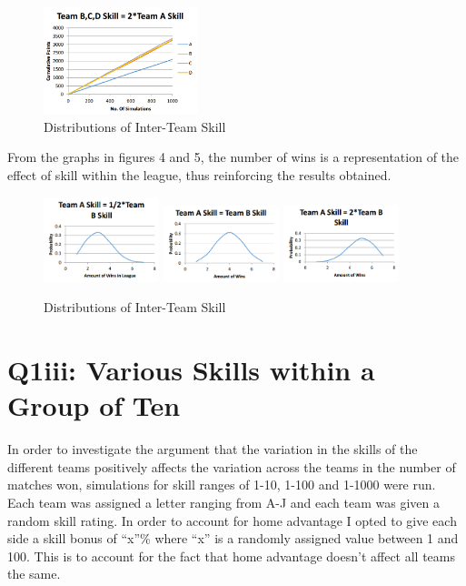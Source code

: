 \documentclass[12pt]{article}
\begin{document}
\begin{figure}[H]
\centering
\includegraphics[width=0.4\textwidth]{twice_skill_a.png}
\caption{Distributions of Inter-Team Skill}
\end{figure}

From the graphs in figures 4 and 5, the number of wins is a representation of the effect of skill within the league, thus reinforcing the results obtained.\cite{tijms}

\begin{figure}[h]
\centering
\includegraphics[width=0.3\textwidth]{skill_a_half_skill_b.png}
\includegraphics[width=0.3\textwidth]{skill_a_equals_skill_b.png}
\includegraphics[width=0.3\textwidth]{skill_a_2x_skill_b.png}
\caption{Distributions of Inter-Team Skill}
\end{figure}

\section{Q1iii: Various Skills within a Group of Ten}
In order to investigate the argument that the variation in the skills of the different teams positively affects the variation across the teams in the number of matches won, simulations for skill ranges of 1-10, 1-100 and 1-1000 were run. Each team was assigned a letter ranging from A-J and each team was given a random skill rating. In order to account for home advantage I opted to give each side a skill bonus of “x”\% where “x” is a randomly assigned value between 1 and 100. This is to account for the fact that home advantage doesn’t affect all teams the same.\cite{williams}
\end{document}
